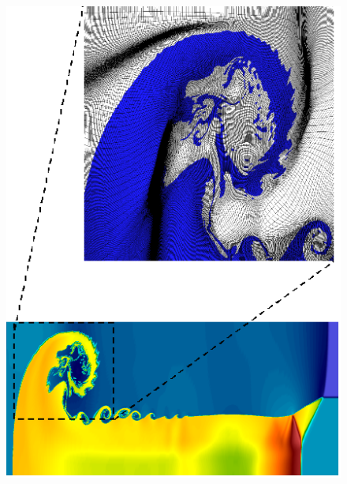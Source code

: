 \documentclass[8pt,xcolor=svgnames]{beamer}
\begin{document}
\begin{frame}
\begin{columns}
  \begin{column}{0.4\textwidth}
    \begin{figure}[h!]
 \centering
 \includegraphics[height=0.8\textheight,keepaspectratio=true]{./Images/lagHydro.png}
\end{figure}
  \end{column}
\end{columns}
\end{frame}
\end{document}
